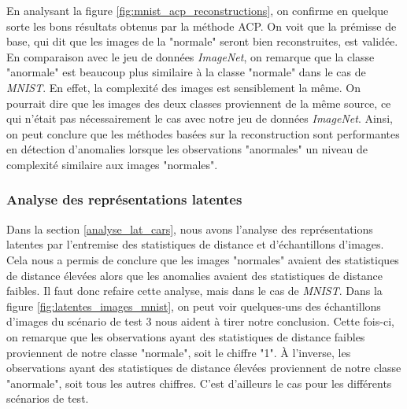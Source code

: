En analysant la figure \ref{fig:mnist_acp_reconstructions}, on confirme en quelque sorte les bons résultats obtenus par la méthode ACP. On voit que la prémisse de base, qui dit que les images de la "normale" seront bien reconstruites, est validée. En comparaison avec le jeu de données  \textit{ImageNet}, on remarque que la classe "anormale" est beaucoup plus similaire à la classe "normale" dans le cas de \textit{MNIST}. En effet, la complexité des images est sensiblement la même. On pourrait dire que les images des deux classes proviennent de la même source, ce qui n'était pas nécessairement le cas avec notre jeu de données \textit{ImageNet}. Ainsi, on peut conclure que les méthodes basées sur la reconstruction sont performantes en détection d'anomalies lorsque les observations "anormales" \DIFdelbegin {}\DIFdelend \DIFaddbegin {}\DIFaddend un niveau de complexité similaire aux images "normales".

\subsubsection{Analyse des représentations latentes} 

Dans la section \ref{analyse_lat_cars}, nous avons \DIFdelbegin {}\DIFdelend \DIFaddbegin {}\DIFaddend l'analyse des représentations latentes par l'entremise des statistiques de distance et d'échantillons d'images. Cela nous a permis de conclure que les images "normales" avaient des statistiques de distance élevées alors que les anomalies avaient des statistiques de distance faibles. Il faut donc refaire cette analyse, mais dans le cas de \textit{MNIST}. Dans la figure \ref{fig:latentes_images_mnist}, on peut voir quelques-uns des échantillons d'images du scénario de test 3 \DIFaddbegin {}\DIFaddend nous aident à tirer notre conclusion. Cette fois-ci, on remarque que les observations ayant des statistiques de distance faibles proviennent de notre classe "normale", soit le chiffre "1". À l'inverse, les observations ayant des statistiques de distance élevées proviennent de notre classe "anormale", soit tous les autres chiffres. C'est d'ailleurs le cas pour les \DIFdelbegin {}\DIFdelend \DIFaddbegin {}\DIFaddend différents scénarios de test.

